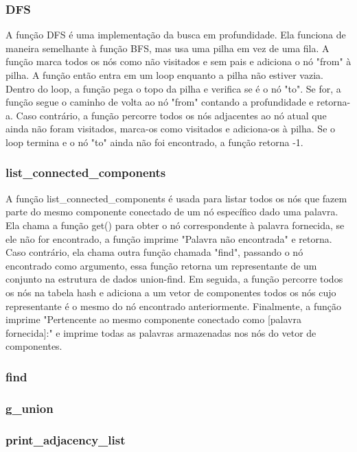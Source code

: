 \documentclass[a4paper,11pt]{article}
\begin{document}
    \subsubsection{DFS}
    A função DFS é uma implementação da busca em profundidade. Ela funciona de maneira semelhante à função BFS, mas usa uma pilha em vez de uma fila. A função marca todos os nós como não visitados e sem pais e adiciona o nó "from" à pilha. A função então entra em um loop enquanto a pilha não estiver vazia. Dentro do loop, a função pega o topo da pilha e verifica se é o nó "to". Se for, a função segue o caminho de volta ao nó "from" contando a profundidade e retorna-a. Caso contrário, a função percorre todos os nós adjacentes ao nó atual que ainda não foram visitados, marca-os como visitados e adiciona-os à pilha. Se o loop termina e o nó "to" ainda não foi encontrado, a função retorna -1.
    
    \subsubsection{list\_connected\_components}
    A função list\_connected\_components é usada para listar todos os nós que fazem parte do mesmo componente conectado de um nó específico dado uma palavra. Ela chama a função get() para obter o nó correspondente à palavra fornecida, se ele não for encontrado, a função imprime "Palavra não encontrada" e retorna. Caso contrário, ela chama outra função chamada "find", passando o nó encontrado como argumento, essa função retorna um representante de um conjunto na estrutura de dados union-find. Em seguida, a função percorre todos os nós na tabela hash e adiciona a um vetor de componentes todos os nós cujo representante é o mesmo do nó encontrado anteriormente. Finalmente, a função imprime "Pertencente ao mesmo componente conectado como [palavra fornecida]:" e imprime todas as palavras armazenadas nos nós do vetor de componentes.
    
    \subsubsection{find}
    
    \subsubsection{g\_union}
    
    \subsubsection{print\_adjacency\_list}
    
\end{document}
